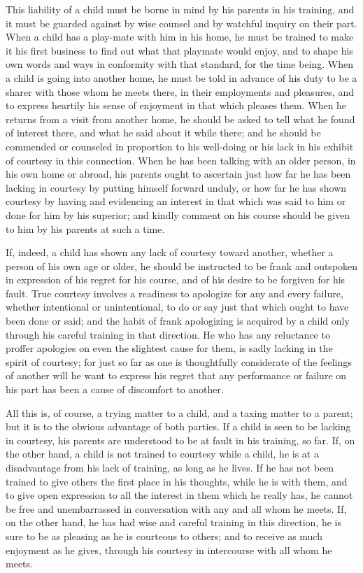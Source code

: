 \documentclass[
]{book}
\begin{document}
This liability of a child must be borne in mind by his parents in his training, and it must be guarded against by wise counsel and by watchful inquiry on their part. When a child has a play-mate with him in his home, he must be trained to make it his first business to find out what that playmate would enjoy, and to shape his own words and ways in conformity with that standard, for the time being. When a child is going into another home, he must be told in advance of his duty to be a sharer with those whom he meets there, in their employments and pleasures, and to express heartily his sense of enjoyment in that which pleases them. When he returns from a visit from another home, he should be asked to tell what he found of interest there, and what he said about it while there; and he should be commended or counseled in proportion to his well-doing or his lack in his exhibit of courtesy in this connection. When he has been talking with an older person, in his own home or abroad, his parents ought to ascertain just how far he has been lacking in courtesy by putting himself forward unduly, or how far he has shown courtesy by having and evidencing an interest in that which was said to him or done for him by his superior; and kindly comment on his course should be given to him by his parents at such a time.

If, indeed, a child has shown any lack of courtesy toward another, whether a person of his own age or older, he should be instructed to be frank and outspoken in expression of his regret for his course, and of his desire to be forgiven for his fault. True courtesy involves a readiness to apologize for any and every failure, whether intentional or unintentional, to do or say just that which ought to have been done or said; and the habit of frank apologizing is acquired by a child only through his careful training in that direction. He who has any reluctance to proffer apologies on even the slightest cause for them, is sadly lacking in the spirit of courtesy; for just so far as one is thoughtfully considerate of the feelings of another will he want to express his regret that any performance or failure on his part has been a cause of discomfort to another.

All this is, of course, a trying matter to a child, and a taxing matter to a parent; but it is to the obvious advantage of both parties. If a child is seen to be lacking in courtesy, his parents are understood to be at fault in his training, so far. If, on the other hand, a child is not trained to courtesy while a child, he is at a disadvantage from his lack of training, as long as he lives. If he has not been trained to give others the first place in his thoughts, while he is with them, and to give open expression to all the interest in them which he really has, he cannot be free and unembarrassed in conversation with any and all whom he meets. If, on the other hand, he has had wise and careful training in this direction, he is sure to be as pleasing as he is courteous to others; and to receive as much enjoyment as he gives, through his courtesy in intercourse with all whom he meets.
\end{document}
